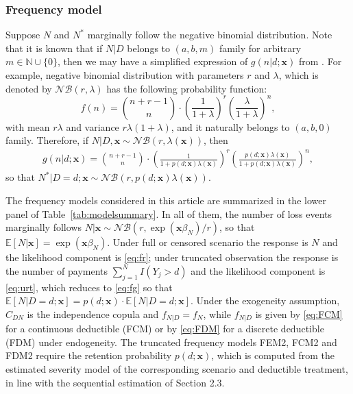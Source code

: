 \documentclass[11pt]{article}
\begin{document}
\subsubsection{Frequency model}
Suppose $N$ and $N^*$ marginally follow the negative binomial distribution. Note that it is known that if $N|D$ belongs to $(a,b,m)$ family for arbitrary $m \in \mathbb{N} \cup \{ 0 \}$, then we may have a simplified expression of $g(n|d;\bm{x})$ from \citet{Klugman2012}. For example, negative binomial distribution with parameters $r$ and $\lambda$, which is denoted by $\mathcal{NB}(r, \lambda)$ has the following probability function:
$$
f(n)=	 {n+r-1 \choose n} \cdot \left( \frac{1}{1+\lambda} \right)^{r} \left( \frac{\lambda}{1+\lambda} \right)^{n},
$$
{with mean $r\lambda$ and variance $r\lambda(1+\lambda)$,} and it naturally belongs to $(a,b,0)$ family. Therefore, if $N|D, \bm{x} \sim \mathcal{NB}(r, \lambda(\bm{x}))$, then
\begin{equation} 
\begin{aligned}  \label{eq:fg}
g(n|d;\bm{x})=	 {n+r-1 \choose n} \cdot \left( \frac{1}{1+p(d;\bm{x})\lambda(\bm{x})} \right)^{r} \left( \frac{p(d;\bm{x})\lambda(\bm{x})}{1+p(d;\bm{x})\lambda(\bm{x})} \right)^{n},
\end{aligned}
\end{equation}
so that $N^{*}|D=d; \bm{x} \sim \mathcal{NB}(r, p(d;\bm{x}) \lambda(\bm{x}))$.

{The frequency models considered in this article are summarized in the lower panel of Table~\ref{tab:modelsummary}. In all of them, the number of loss events marginally follows $N|\bm{x} \sim \mathcal{NB}(r, \exp(\bm{x}\beta_{N}) /r)$, so that $\mathbb{E}[N|\bm{x}]=\exp(\bm{x}\beta_{N})$. Under full or censored scenario the response is $N$ and the likelihood component is \eqref{eq:fr}; under truncated observation the response is the number of payments $\sum_{j=1}^{N} I(Y_{j}>d)$ and the likelihood component is \eqref{eq:urt}, which reduces to \eqref{eq:fg} so that $\mathbb{E}[N|D=d; \bm{x}]=p(d;\bm{x}) \cdot \mathbb{E}[N|D=d;\bm{x}]$. Under the exogeneity assumption, $C_{DN}$ is the independence copula and $f_{N|D}=f_{N}$, while $f_{N|D}$ is given by \eqref{eq:FCM} for a continuous deductible (FCM) or by \eqref{eq:FDM} for a discrete deductible (FDM) under endogeneity. The truncated frequency models FEM2, FCM2 and FDM2 require the retention probability $p(d;\bm{x})$, which is computed from the estimated severity model of the corresponding scenario and deductible treatment, in line with the sequential estimation of Section 2.3.}
\end{document}
